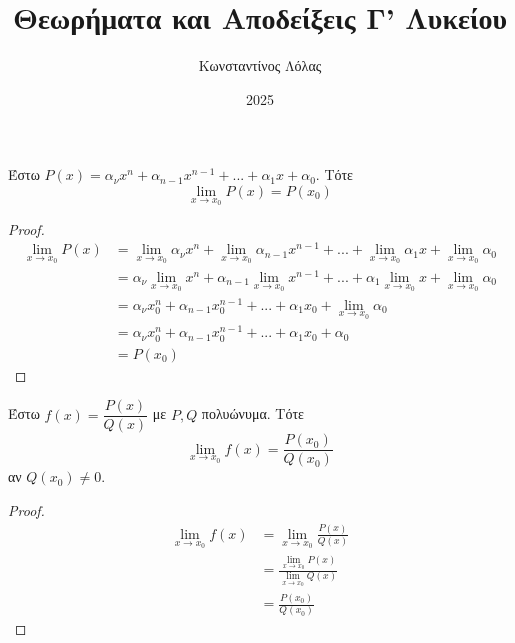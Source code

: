 \documentclass[a4paper, 12pt]{article}
\title{Θεωρήματα και Αποδείξεις Γ' Λυκείου}
\author{Κωνσταντίνος Λόλας}
\date{2025}
\begin{document}
\maketitle

\begin{theorem}{}
  Έστω $P(x)=α_νx^n+α_{n-1}x^{n-1}+...+α_1x+α_0$. Τότε
  $$\lim_{x\to x_0}P(x)=P(x_0)$$
\end{theorem}
\begin{proof}
  \begin{align*}
    \lim_{x\to x_0}P(x) & =\lim_{x\to x_0}α_νx^n+\lim_{x\to x_0}α_{n-1}x^{n-1}+...+\lim_{x\to x_0}α_1x+\lim_{x\to x_0}α_0 \\
                        & =α_ν\lim_{x\to x_0}x^n+α_{n-1}\lim_{x\to x_0}x^{n-1}+...+α_1\lim_{x\to x_0}x+\lim_{x\to x_0}α_0 \\
                        & =α_νx_0^n+α_{n-1}x_0^{n-1}+...+α_1x_0+\lim_{x\to x_0}α_0                                        \\
                        & =α_νx_0^n+α_{n-1}x_0^{n-1}+...+α_1x_0+α_0                                                       \\
                        & =P(x_0)
  \end{align*}
\end{proof}

\begin{theorem}{}
  Έστω $f(x)=\dfrac{P(x)}{Q(x)}$ με $P,Q$ πολυώνυμα. Τότε
  $$\lim_{x\to x_0}f(x)=\frac{P(x_0)}{Q(x_0)}$$
  αν $Q(x_0)\neq 0$.
\end{theorem}
\begin{proof}
  \begin{align*}
    \lim_{x\to x_0}f(x) & =\lim_{x\to x_0}\frac{P(x)}{Q(x)}                \\
                        & =\frac{\lim_{x\to x_0}P(x)}{\lim_{x\to x_0}Q(x)} \\
                        & =\frac{P(x_0)}{Q(x_0)}
  \end{align*}
\end{proof}
\end{document}
